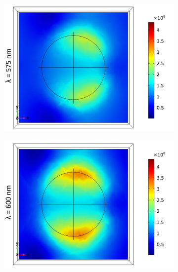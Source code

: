 \begin{figure}[htb!]  %
    \begin{subfigure}{0.32\textwidth}    %
        \centering
        \includegraphics[width=\linewidth]{figures/ch4/S5A/FieldDistribution/LSPR/Sample5A_TE_Slice@z=-05t_wl=575_notitle.png}
   \end{subfigure}
   \begin{subfigure}{0.32\textwidth}
        \centering
        \includegraphics[width=\linewidth]{figures/ch4/S5A/FieldDistribution/LSPR/Sample5A_TE_Slice@z=-05t_wl=600_notitle.png}
   \end{subfigure}
   \begin{subfigure}{0.32\textwidth}

\end{subfigure}
\end{figure}
